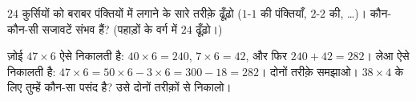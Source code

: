 \begin{exercise}[$\star\star$]\label{exo:g3:mult:11}
$24$ कुर्सियों को बराबर पंक्तियों में लगाने के सारे तरीक़े ढूँढ़ो
($1$-$1$ की पंक्तियाँ, $2$-$2$ की, \dots)। कौन-कौन-सी सजावटें
संभव हैं? (पहाड़ों के वर्ग में $24$ ढूँढ़ो।)
\end{exercise}

\begin{exercise}[$\star\star$]\label{exo:g3:mult:12}
ज़ोई $47 \times 6$ ऐसे निकालती है: $40 \times 6 = 240$,
$7 \times 6 = 42$, और फिर $240 + 42 = 282$। लेआ ऐसे निकालती है:
$47 \times 6 = 50 \times 6 - 3 \times 6 = 300 - 18 = 282$। दोनों
तरीक़े समझाओ। $38 \times 4$ के लिए तुम्हें कौन-सा पसंद है? उसे
दोनों तरीक़ों से निकालो।
\end{exercise}
